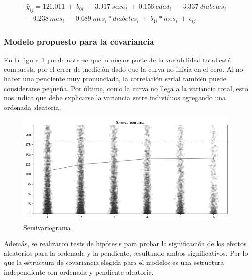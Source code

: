 \documentclass[spanish]{article}
\numberwithin{figure}{subsection}
\numberwithin{equation}{subsection}
\numberwithin{table}{subsection}
\begin{document}

\begin{multline}
	\label{modelo_simple}
	\hat{y}_{ij} = 121.011\ +\ b_{0i}\ +\ 3.917\ sexo_i\ +\ 0.156\ edad_i\ -
	\ 3.337\ diabetes_i \\
	-\ 0.238\ mes_i\ -\ 0.689\ mes_i*diabetes_i\ +\ b_{1i}*mes_i\ +
	\ \epsilon_{ij}
\end{multline}

\subsubsection{Modelo propuesto para la covariancia}

En la figura \ref{semivariogram} puede notarse que la mayor parte de la
variabilidad total está compuesta por el error de medición dado que la curva no
inicia en el cero. Al no haber una pendiente muy pronunciada, la correlación
serial también puede considerarse pequeña. Por último, como la curva no llega a
la variancia total, esto nos indica que debe explicarse la variancia entre
individuos agregando una ordenada aleatoria.


\begin{figure}[H]
	\centering
	\includegraphics[scale=0.4]{img/semivariogram.png}
	\caption{Semivariograma}
	\label{semivariogram}
\end{figure}

Además, se realizaron tests de hipótesis para probar la significación de los
efectos aleatorios para la ordenada y la pendiente, resultando ambos
significativos. Por lo que la estructura de covariancia elegida para el modelos
es una estructura independiente con ordenada y pendiente aleatoria.
\end{document}
